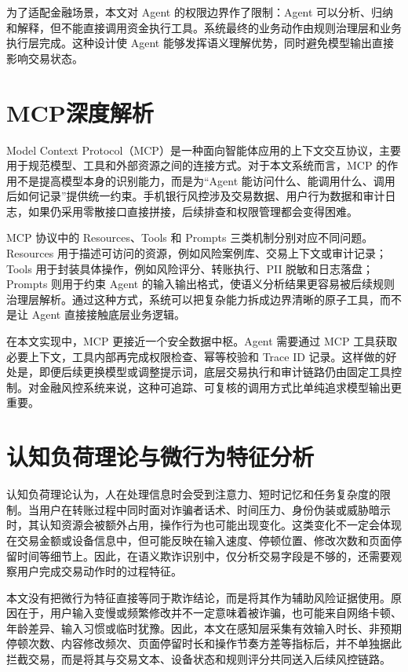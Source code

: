 \documentclass{xduugthesis}
\begin{document}
为了适配金融场景，本文对 Agent 的权限边界作了限制：Agent 可以分析、归纳和解释，但不能直接调用资金执行工具。系统最终的业务动作由规则治理层和业务执行层完成。这种设计使 Agent 能够发挥语义理解优势，同时避免模型输出直接影响交易状态。

\section{MCP深度解析}
Model Context Protocol（MCP）是一种面向智能体应用的上下文交互协议，主要用于规范模型、工具和外部资源之间的连接方式。对于本文系统而言，MCP 的作用不是提高模型本身的识别能力，而是为“Agent 能访问什么、能调用什么、调用后如何记录”提供统一约束。手机银行风控涉及交易数据、用户行为数据和审计日志，如果仍采用零散接口直接拼接，后续排查和权限管理都会变得困难。

MCP 协议中的 Resources、Tools 和 Prompts 三类机制分别对应不同问题。Resources 用于描述可访问的资源，例如风险案例库、交易上下文或审计记录；Tools 用于封装具体操作，例如风险评分、转账执行、PII 脱敏和日志落盘；Prompts 则用于约束 Agent 的输入输出格式，使语义分析结果更容易被后续规则治理层解析。通过这种方式，系统可以把复杂能力拆成边界清晰的原子工具，而不是让 Agent 直接接触底层业务逻辑。

在本文实现中，MCP 更接近一个安全数据中枢。Agent 需要通过 MCP 工具获取必要上下文，工具内部再完成权限检查、幂等校验和 Trace ID 记录。这样做的好处是，即便后续更换模型或调整提示词，底层交易执行和审计链路仍由固定工具控制。对金融风控系统来说，这种可追踪、可复核的调用方式比单纯追求模型输出更重要。

\section{认知负荷理论与微行为特征分析}
认知负荷理论认为，人在处理信息时会受到注意力、短时记忆和任务复杂度的限制。当用户在转账过程中同时面对诈骗者话术、时间压力、身份伪装或威胁暗示时，其认知资源会被额外占用，操作行为也可能出现变化\cite{ibraheem2025duress}。这类变化不一定会体现在交易金额或设备信息中，但可能反映在输入速度、停顿位置、修改次数和页面停留时间等细节上。因此，在语义欺诈识别中，仅分析交易字段是不够的，还需要观察用户完成交易动作时的过程特征。

本文没有把微行为特征直接等同于欺诈结论，而是将其作为辅助风险证据使用。原因在于，用户输入变慢或频繁修改并不一定意味着被诈骗，也可能来自网络卡顿、年龄差异、输入习惯或临时犹豫。因此，本文在感知层采集有效输入时长、非预期停顿次数、内容修改频次、页面停留时长和操作节奏方差等指标后，并不单独据此拦截交易，而是将其与交易文本、设备状态和规则评分共同送入后续风控链路。
\end{document}
